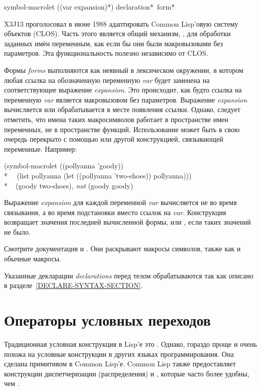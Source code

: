 \begin{defspec}
symbol-macrolet ({(var expansion)}*)
                {declaration}* {\,form}*

X3J13 проголосовал в июне 1988
адаптировать Common Lisp'овую систему объектов (CLOS). Часть этого является
общий механизм, , для обработки заданных имён переменным,
как если бы они были макровызовами без параметров. Эта функциональность
полезно независимо от CLOS.

Формы \emph{forms} выполняются как неявный  в лексическом окружении,
в котором любая ссылка на обозначенную переменную \emph{var} будет заменена на
соответствующее выражение \emph{expansion}. Это происходит, как будто ссылка на
переменную \emph{var} является макровызовом без параметров.
Выражение \emph{expansion} вычисляется или обрабатывается в месте появления
ссылки. Однако, следует отметить, что имена таких макросимволов работает в
пространстве имен переменных, не в пространстве функций. 
Использование  может быть в свою очередь перекрыто с
помощью  или другой конструкцией, связывающей переменные. Например:
\begin{lisp}
(symbol-macrolet ((pollyanna 'goody)) \\*
~~(list pollyanna (let ((pollyanna 'two-shoes)) pollyanna))) \\*
~{\EV} (goody two-shoes)\textrm{, \emph{not}} (goody goody)
\end{lisp}

Выражение \emph{expansion} для каждой переменной \emph{var} вычисляется не во
время связывания, а во время подстановки вместо ссылок на \emph{var}.
Конструкция возвращает значения последней вычисленной формы, или , если
таких значений не было.

Смотрите документация  и . Они раскрывают
макросы символов, также как и обычные макросы.

Указанные декларации \emph{declarations} перед телом обрабатываются так как
описано в разделе~\ref{DECLARE-SYNTAX-SECTION}.
\end{defspec}

\section{Операторы условных переходов}

Традиционная условная конструкция в Lisp'е это .
Однако,  гораздо проще и очень похожа на условные конструкции в других
языках программирования. Она сделана примитивом в Common Lisp'е.
Common Lisp также предоставляет конструкции диспетчеризации (распределения)
 и , которые часто более удобны, чем .

